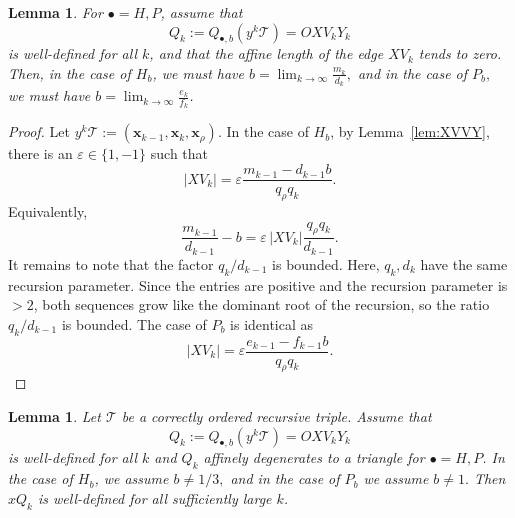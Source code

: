\documentclass[11pt, reqno]{amsart}
\newtheorem{lemma}[thm]{Lemma}
\theoremstyle{remark}
\numberwithin{equation}{subsection}
\numberwithin{figure}{section}
\theoremstyle{customremark}
\newcommand{\Tt}{\mathcal{T}}
\newcommand{\eps}{\varepsilon}
\begin{document}
\begin{lemma}\label{lem:affineDegenerationLimitH}
 For $\bullet=H,P$, assume that
\[
        Q_k:=Q_{\bullet,b}(y^k\Tt)=OXV_kY_k
\]
is well-defined for all $k$, and that the affine length of the edge
$XV_k$ tends to zero. Then, in the case of $H_b$, we must have $b=\lim_{k \to \infty} \frac{m_k}{d_k},$ and in the case of $P_b,$ we must have $b=\lim_{k \to \infty} \frac{e_k}{f_k}$. 
\end{lemma}

\begin{proof}
Let $y^k\Tt:=(\bm{x}_{k-1},\bm{x}_k,\bm{x}_\rho).$ In the case of $H_b$, by Lemma~\ref{lem:XVVY}, 
there is an $\eps\in\{1,-1\}$ such that
\[
        |XV_k|
        =
        \eps\frac{m_{k-1}-d_{k-1}b}{q_\rho q_k}.
\]
Equivalently,
\[
        \frac{m_{k-1}}{d_{k-1}}-b
        =
        \eps\,|XV_k|\frac{q_\rho q_k}{d_{k-1}}.
\]
It remains to note that the factor $q_k/d_{k-1}$ is bounded. Here, $q_k,d_k$ have the same recursion parameter. Since the entries are positive and the recursion parameter is \(>2\), both
sequences grow like the dominant root of the recursion, so the ratio
\(q_k/d_{k-1}\) is bounded. The case of $P_b$ is identical as
\[ |XV_k|=\eps \frac{e_{k-1}-f_{k-1}b}{q_\rho q_k}.\]
\end{proof}
\begin{lemma}\label{lem:yTailXVisible}
Let $\Tt$ be a correctly ordered recursive triple. 
Assume that
\[
        Q_k:=Q_{\bullet,b}(y^k\Tt)=OXV_kY_k
\]
is well-defined for all $k$ and $Q_k$ affinely degenerates to a triangle for $\bullet=H,P$. In the case of $H_b$, we assume $b \neq 1/3,$ and in the case of $P_b$ we assume $b \neq 1.$ Then $xQ_k$ is well-defined for all sufficiently large $k$.

\end{lemma}
\end{document}
